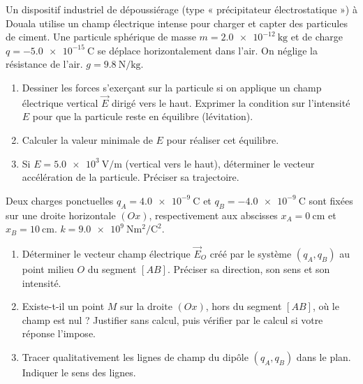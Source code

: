 \documentclass[11pt]{article}
\begin{document}
\begin{exercice}
Un dispositif industriel de dépoussiérage (type « précipitateur électrostatique ») à Douala utilise un champ électrique intense pour charger et capter des particules de ciment. Une particule sphérique de masse $m = \SI{2,0e-12}{\kilogram}$ et de charge $q = \SI{-5,0e-15}{\coulomb}$ se déplace horizontalement dans l'air. On néglige la résistance de l'air. $g = \SI{9,8}{\newton\per\kilogram}$.
\begin{enumerate}
    \item Dessiner les forces s'exerçant sur la particule si on applique un champ électrique vertical $\vec{E}$ dirigé vers le haut. Exprimer la condition sur l'intensité $E$ pour que la particule reste en équilibre (lévitation).
    \item Calculer la valeur minimale de $E$ pour réaliser cet équilibre.
    \item Si $E = \SI{5,0e3}{\volt\per\meter}$ (vertical vers le haut), déterminer le vecteur accélération de la particule. Préciser sa trajectoire.
\end{enumerate}
\end{exercice}

\begin{exercice}
Deux charges ponctuelles $q_A = \SI{+4,0e-9}{\coulomb}$ et $q_B = \SI{-4,0e-9}{\coulomb}$ sont fixées sur une droite horizontale $(Ox)$, respectivement aux abscisses $x_A = \SI{0}{\centi\meter}$ et $x_B = \SI{10}{\centi\meter}$. $k = \SI{9,0e9}{\newton\meter\squared\per\coulomb\squared}$.
\begin{enumerate}
    \item Déterminer le vecteur champ électrique $\vec{E}_O$ créé par le système $(q_A, q_B)$ au point milieu $O$ du segment $[AB]$. Préciser sa direction, son sens et son intensité.
    \item Existe-t-il un point $M$ sur la droite $(Ox)$, hors du segment $[AB]$, où le champ est nul ? Justifier sans calcul, puis vérifier par le calcul si votre réponse l'impose.
    \item Tracer qualitativement les lignes de champ du dipôle $(q_A, q_B)$ dans le plan. Indiquer le sens des lignes.
\end{enumerate}
\end{exercice}
\end{document}
